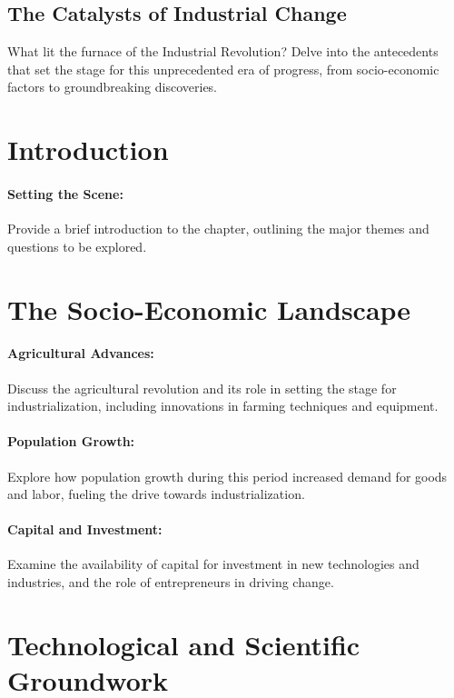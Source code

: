 \documentclass[a4paper,12pt]{book}
\begin{document}
\subsection*{The Catalysts of Industrial Change}
What lit the furnace of the Industrial Revolution? Delve into the antecedents that set the stage for this unprecedented era of progress, from socio-economic factors to groundbreaking discoveries.

\section*{Introduction}

\paragraph{Setting the Scene:}
Provide a brief introduction to the chapter, outlining the major themes and questions to be explored.

\section*{The Socio-Economic Landscape}

\paragraph{Agricultural Advances:}
Discuss the agricultural revolution and its role in setting the stage for industrialization, including innovations in farming techniques and equipment.

\paragraph{Population Growth:}
Explore how population growth during this period increased demand for goods and labor, fueling the drive towards industrialization.

\paragraph{Capital and Investment:}
Examine the availability of capital for investment in new technologies and industries, and the role of entrepreneurs in driving change.

\section*{Technological and Scientific Groundwork}
\end{document}
